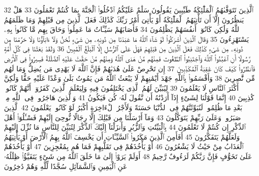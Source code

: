{\tiny\colorbox{cl_aya}{32}} ٱلَّذِينَ تَتَوَفَّىٰهُمُ ٱلْمَلَٰٓئِكَةُ طَيِّبِينَ يَقُولُونَ سَلَٰمٌ عَلَيْكُمُ ٱدْخُلُوا۟ ٱلْجَنَّةَ بِمَا كُنتُمْ تَعْمَلُونَ
{\tiny\colorbox{cl_aya}{33}} هَلْ يَنظُرُونَ إِلَّآ أَن تَأْتِيَهُمُ ٱلْمَلَٰٓئِكَةُ أَوْ يَأْتِىَ أَمْرُ رَبِّكَ كَذَٰلِكَ فَعَلَ ٱلَّذِينَ مِن قَبْلِهِمْ وَمَا ظَلَمَهُمُ ٱللَّهُ وَلَٰكِن كَانُوٓا۟ أَنفُسَهُمْ يَظْلِمُونَ
{\tiny\colorbox{cl_aya}{34}} فَأَصَابَهُمْ سَيِّـَٔاتُ مَا عَمِلُوا۟ وَحَاقَ بِهِم مَّا كَانُوا۟ بِهِۦ يَسْتَهْزِءُونَ
{\tiny\colorbox{cl_aya}{35}} وَقَالَ ٱلَّذِينَ أَشْرَكُوا۟ لَوْ شَآءَ ٱللَّهُ مَا عَبَدْنَا مِن دُونِهِۦ مِن شَىْءٍ نَّحْنُ وَلَآ ءَابَآؤُنَا وَلَا حَرَّمْنَا مِن دُونِهِۦ مِن شَىْءٍ كَذَٰلِكَ فَعَلَ ٱلَّذِينَ مِن قَبْلِهِمْ فَهَلْ عَلَى ٱلرُّسُلِ إِلَّا ٱلْبَلَٰغُ ٱلْمُبِينُ
{\tiny\colorbox{cl_aya}{36}} وَلَقَدْ بَعَثْنَا فِى كُلِّ أُمَّةٍ رَّسُولًا أَنِ ٱعْبُدُوا۟ ٱللَّهَ وَٱجْتَنِبُوا۟ ٱلطَّٰغُوتَ فَمِنْهُم مَّنْ هَدَى ٱللَّهُ وَمِنْهُم مَّنْ حَقَّتْ عَلَيْهِ ٱلضَّلَٰلَةُ فَسِيرُوا۟ فِى ٱلْأَرْضِ فَٱنظُرُوا۟ كَيْفَ كَانَ عَٰقِبَةُ ٱلْمُكَذِّبِينَ
{\tiny\colorbox{cl_aya}{37}} إِن تَحْرِصْ عَلَىٰ هُدَىٰهُمْ فَإِنَّ ٱللَّهَ لَا يَهْدِى مَن يُضِلُّ وَمَا لَهُم مِّن نَّٰصِرِينَ
{\tiny\colorbox{cl_aya}{38}} وَأَقْسَمُوا۟ بِٱللَّهِ جَهْدَ أَيْمَٰنِهِمْ لَا يَبْعَثُ ٱللَّهُ مَن يَمُوتُ بَلَىٰ وَعْدًا عَلَيْهِ حَقًّا وَلَٰكِنَّ أَكْثَرَ ٱلنَّاسِ لَا يَعْلَمُونَ
{\tiny\colorbox{cl_aya}{39}} لِيُبَيِّنَ لَهُمُ ٱلَّذِى يَخْتَلِفُونَ فِيهِ وَلِيَعْلَمَ ٱلَّذِينَ كَفَرُوٓا۟ أَنَّهُمْ كَانُوا۟ كَٰذِبِينَ
{\tiny\colorbox{cl_aya}{40}} إِنَّمَا قَوْلُنَا لِشَىْءٍ إِذَآ أَرَدْنَٰهُ أَن نَّقُولَ لَهُۥ كُن فَيَكُونُ
{\tiny\colorbox{cl_aya}{41}} وَٱلَّذِينَ هَاجَرُوا۟ فِى ٱللَّهِ مِنۢ بَعْدِ مَا ظُلِمُوا۟ لَنُبَوِّئَنَّهُمْ فِى ٱلدُّنْيَا حَسَنَةً وَلَأَجْرُ ٱلْءَاخِرَةِ أَكْبَرُ لَوْ كَانُوا۟ يَعْلَمُونَ
{\tiny\colorbox{cl_aya}{42}} ٱلَّذِينَ صَبَرُوا۟ وَعَلَىٰ رَبِّهِمْ يَتَوَكَّلُونَ
{\tiny\colorbox{cl_aya}{43}} وَمَآ أَرْسَلْنَا مِن قَبْلِكَ إِلَّا رِجَالًا نُّوحِىٓ إِلَيْهِمْ فَسْـَٔلُوٓا۟ أَهْلَ ٱلذِّكْرِ إِن كُنتُمْ لَا تَعْلَمُونَ
{\tiny\colorbox{cl_aya}{44}} بِٱلْبَيِّنَٰتِ وَٱلزُّبُرِ وَأَنزَلْنَآ إِلَيْكَ ٱلذِّكْرَ لِتُبَيِّنَ لِلنَّاسِ مَا نُزِّلَ إِلَيْهِمْ وَلَعَلَّهُمْ يَتَفَكَّرُونَ
{\tiny\colorbox{cl_aya}{45}} أَفَأَمِنَ ٱلَّذِينَ مَكَرُوا۟ ٱلسَّيِّـَٔاتِ أَن يَخْسِفَ ٱللَّهُ بِهِمُ ٱلْأَرْضَ أَوْ يَأْتِيَهُمُ ٱلْعَذَابُ مِنْ حَيْثُ لَا يَشْعُرُونَ
{\tiny\colorbox{cl_aya}{46}} أَوْ يَأْخُذَهُمْ فِى تَقَلُّبِهِمْ فَمَا هُم بِمُعْجِزِينَ
{\tiny\colorbox{cl_aya}{47}} أَوْ يَأْخُذَهُمْ عَلَىٰ تَخَوُّفٍ فَإِنَّ رَبَّكُمْ لَرَءُوفٌ رَّحِيمٌ
{\tiny\colorbox{cl_aya}{48}} أَوَلَمْ يَرَوْا۟ إِلَىٰ مَا خَلَقَ ٱللَّهُ مِن شَىْءٍ يَتَفَيَّؤُا۟ ظِلَٰلُهُۥ عَنِ ٱلْيَمِينِ وَٱلشَّمَآئِلِ سُجَّدًا لِّلَّهِ وَهُمْ دَٰخِرُونَ

